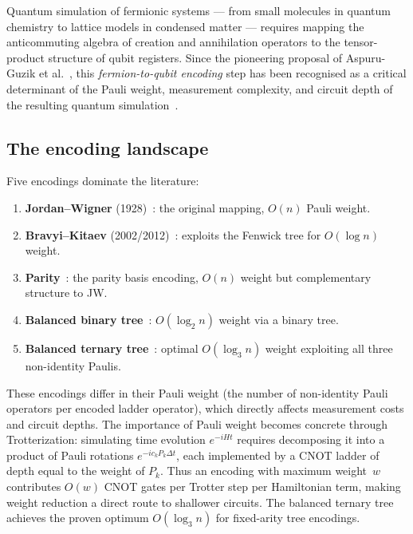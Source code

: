 %

Quantum simulation of fermionic systems --- from small molecules in
quantum chemistry to lattice models in condensed matter --- requires
mapping the anticommuting algebra of creation and annihilation
operators to the tensor-product structure of qubit registers.  Since
the pioneering proposal of Aspuru-Guzik et al.~\cite{aspuruguzik2005},
this \emph{fermion-to-qubit encoding} step has been recognised as a
critical determinant of the Pauli weight, measurement complexity, and
circuit depth of the resulting quantum
simulation~\cite{whitfield2011, tranter2015, havlicek2017}.

\subsection{The encoding landscape}

Five encodings dominate the literature:
\begin{enumerate}
  \item \textbf{Jordan--Wigner} (1928)~\cite{jordan1928}: the
    original mapping, $O(n)$ Pauli weight.
  \item \textbf{Bravyi--Kitaev} (2002/2012)~\cite{bravyi2002,
    seeley2012}: exploits the Fenwick tree for $O(\log n)$ weight.
  \item \textbf{Parity}~\cite{seeley2012, bravyi2017tapering}:
    the parity basis encoding, $O(n)$ weight but complementary
    structure to JW.
  \item \textbf{Balanced binary tree}~\cite{steudtner2018}:
    $O(\log_2 n)$ weight via a binary tree.
  \item \textbf{Balanced ternary tree}~\cite{jiang2020,
    miller2023bonsai}: optimal $O(\log_3 n)$ weight exploiting all
    three non-identity Paulis.
\end{enumerate}

These encodings differ in their Pauli weight (the number of non-identity
Pauli operators per encoded ladder operator), which directly affects
measurement costs and circuit depths.  The importance of Pauli weight
becomes concrete through Trotterization: simulating time evolution
$e^{-iHt}$ requires decomposing it into a product of Pauli rotations
$e^{-i c_k P_k \Delta t}$, each implemented by a CNOT ladder of depth
equal to the weight of $P_k$.  Thus an encoding with maximum weight~$w$
contributes $O(w)$ CNOT gates per Trotter step per Hamiltonian term,
making weight reduction a direct route to shallower circuits.  The
balanced ternary tree achieves the proven optimum $O(\log_3 n)$ for
fixed-arity tree encodings.

